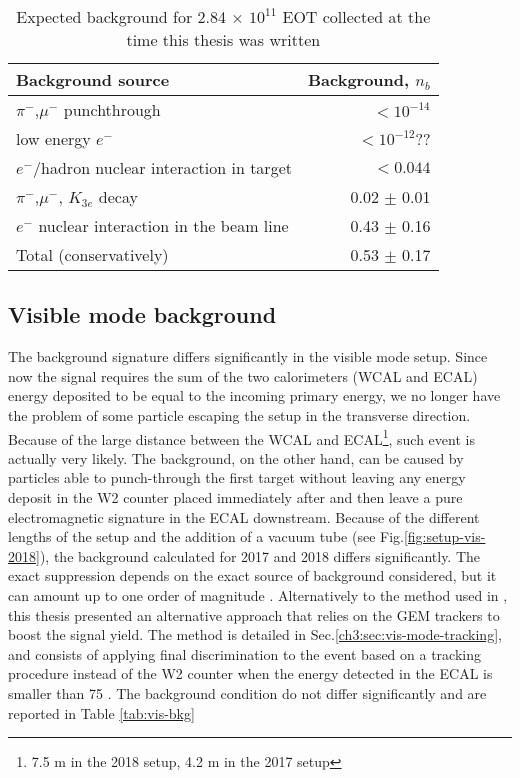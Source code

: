 \begin{table}[bth!]
  \centering
  \caption[Invisible mode background]{Expected background for 2.84 $\times$ $10^{11}$ EOT collected at the time this thesis was written \cite{NA64:2019imj}}
  \begin{tabular}{lr}
    \hline \hline
    Background source & Background, $n_b$ \\
    \hline
    $\pi^-$,$\mu^-$ punchthrough                      & $<10^{-14}$ \\
    low energy $e^-$                                  & $<10^{-12}$?? \\
    $e^-$/hadron nuclear interaction in target        & $<0.044$ \\
    $\pi^-$,$\mu^-$, $K_{3e}$ decay                    & 0.02 $\pm$ 0.01 \\
    $e^-$ nuclear interaction in the  beam line       & 0.43 $\pm$ 0.16 \\
    \hline
    Total (conservatively)                            & 0.53 $\pm$ 0.17 \\
    \hline \hline                       
  \end{tabular}
  \label{tab:inv-bkg}
\end{table}


\subsection{Visible mode background}

The background signature differs significantly in the visible mode setup. Since now the signal requires the sum of the two calorimeters (WCAL and ECAL) energy deposited to be equal to the incoming primary energy, we no longer have the problem of some particle escaping the setup in the transverse direction. Because of the large distance between the WCAL and ECAL\footnote{7.5 \si{\meter} in the 2018 setup, 4.2 \si{\meter} in the 2017 setup}, such event is actually very likely. The background, on the other hand, can be caused by particles able to punch-through the first target without leaving any energy deposit in the W2 counter placed immediately after and then leave a pure electromagnetic signature in the ECAL downstream. Because of the different lengths of the setup and the addition of a vacuum tube (see Fig.\ref{fig:setup-vis-2018}), the background calculated for 2017 and 2018 differs significantly. The exact suppression depends on the exact source of background considered, but it can amount up to one order of magnitude \cite{Banerjee:2019hmi}. Alternatively to the method used in \cite{Banerjee:2019hmi}, this thesis presented an alternative approach that relies on the GEM trackers to boost the signal yield. The method is detailed in Sec.\ref{ch3:sec:vis-mode-tracking}, and consists of applying final discrimination to the event based on a tracking procedure instead of the W2 counter when the energy detected in the ECAL is smaller than 75 \gev. The background condition do not differ significantly and are reported in Table \ref{tab:vis-bkg}


